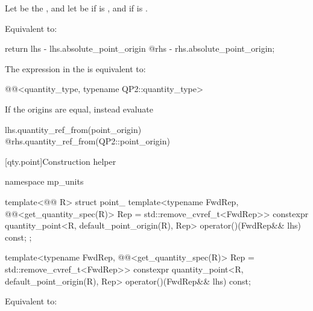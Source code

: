 \begin{itemdescr}
\pnum
Let  be the , and
let  be
 if  is \tcode{==}, and
 if  is \tcode{<=>}.

\pnum
\effects
Equivalent to:
\begin{codeblock}
return lhs - lhs.absolute_point_origin @\atsign@ rhs - rhs.absolute_point_origin;
\end{codeblock}

\pnum
\remarks
The expression in the  is equivalent to:
\begin{codeblock}
@@<quantity_type, typename QP2::quantity_type>
\end{codeblock}

\pnum
\recommended
If the origins are equal, instead evaluate
\begin{codeblock}
lhs.quantity_ref_from(point_origin) @\atsign@ rhs.quantity_ref_from(QP2::point_origin)
\end{codeblock}
\end{itemdescr}

[qty.point]{Construction helper }

\begin{codeblock}
namespace mp_units {

template<@@ R>
struct point_ {
  template<typename FwdRep,
           @@<get_quantity_spec(R{})> Rep = std::remove_cvref_t<FwdRep>>
  constexpr quantity_point<R{}, default_point_origin(R{}), Rep> operator()(FwdRep&& lhs) const;
};

}
\end{codeblock}

\begin{itemdecl}
template<typename FwdRep,
         @@<get_quantity_spec(R{})> Rep = std::remove_cvref_t<FwdRep>>
constexpr quantity_point<R{}, default_point_origin(R{}), Rep> operator()(FwdRep&& lhs) const;
\end{itemdecl}

\begin{itemdescr}
\pnum
\effects
Equivalent to:
\end{itemdescr}

